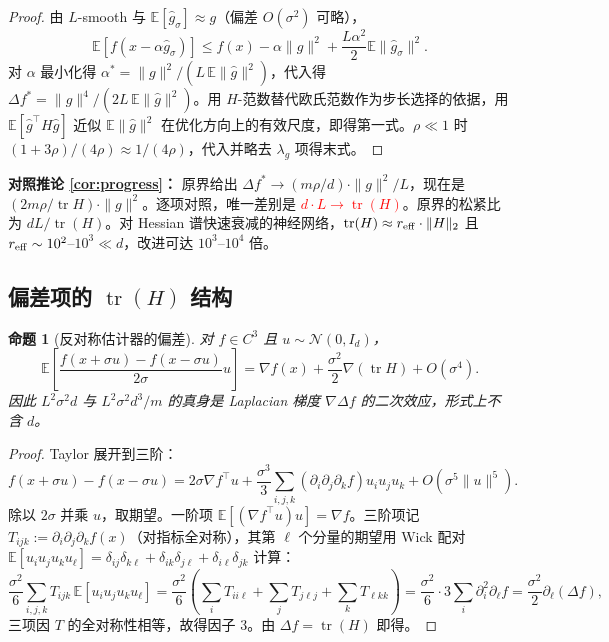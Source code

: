 \documentclass[UTF8]{ctexart}
\newtheorem{proposition}{命题}
\begin{document}
\begin{proof}
由 $L$-smooth 与 $\mathbb E[\widehat g_\sigma]\approx g$（偏差 $O(\sigma^2)$ 可略），
\[
\mathbb E[f(x - \alpha\widehat g_\sigma)]
\leq
f(x) - \alpha\|g\|^2 + \frac{L\alpha^2}{2}\mathbb E\|\widehat g_\sigma\|^2.
\]
对 $\alpha$ 最小化得 $\alpha^* = \|g\|^2/(L\,\mathbb E\|\widehat g\|^2)$，代入得 $\Delta f^* = \|g\|^4/(2L\,\mathbb E\|\widehat g\|^2)$。用 $H$-范数替代欧氏范数作为步长选择的依据，用 $\mathbb E[\widehat g^\top H\widehat g]$ 近似 $\mathbb E\|\widehat g\|^2$ 在优化方向上的有效尺度，即得第一式。$\rho\ll 1$ 时 $(1+3\rho)/(4\rho)\approx 1/(4\rho)$，代入并略去 $\lambda_g$ 项得末式。
\end{proof}

\textbf{对照推论 \ref{cor:progress}：} 原界给出 $\Delta f^* \to (m\rho/d)\cdot\|g\|^2/L$，现在是 $(2m\rho/\operatorname{tr} H)\cdot\|g\|^2$。逐项对照，唯一差别是 \textcolor{red}{$d\cdot L \to \operatorname{tr}(H)$}。原界的松紧比为 $dL/\operatorname{tr}(H)$。对 Hessian 谱快速衰减的神经网络，$\operatorname{tr}(H) \approx r_{\rm eff}\cdot\|H\|_2$ 且 $r_{\rm eff} \sim 10^2$–$10^3 \ll d$，改进可达 $10^3$–$10^4$ 倍。

\subsection{偏差项的 $\operatorname{tr}(H)$ 结构}

\begin{proposition}[反对称估计器的偏差]
\label{prop:bias-trace}
对 $f\in C^3$ 且 $u\sim\mathcal N(0,I_d)$，
\[
\boxed{
\mathbb E\left[\frac{f(x+\sigma u) - f(x-\sigma u)}{2\sigma}u\right]
=
\nabla f(x) + \frac{\sigma^2}{2}\nabla(\operatorname{tr} H) + O(\sigma^4).
}
\]
因此 $L^2\sigma^2 d$ 与 $L^2\sigma^2 d^3/m$ 的真身是 Laplacian 梯度 $\nabla\Delta f$ 的二次效应，形式上不含 $d$。
\end{proposition}

\begin{proof}
Taylor 展开到三阶：
\[
f(x+\sigma u) - f(x-\sigma u)
=
2\sigma\nabla f^\top u + \frac{\sigma^3}{3}\sum_{i,j,k}(\partial_i\partial_j\partial_k f)u_i u_j u_k + O(\sigma^5\|u\|^5).
\]
除以 $2\sigma$ 并乘 $u$，取期望。一阶项 $\mathbb E[(\nabla f^\top u)u] = \nabla f$。三阶项记 $T_{ijk} := \partial_i\partial_j\partial_k f(x)$（对指标全对称），其第 $\ell$ 个分量的期望用 Wick 配对 $\mathbb E[u_i u_j u_k u_\ell] = \delta_{ij}\delta_{k\ell} + \delta_{ik}\delta_{j\ell} + \delta_{i\ell}\delta_{jk}$ 计算：
\[
\frac{\sigma^2}{6}\sum_{i,j,k}T_{ijk}\,\mathbb E[u_i u_j u_k u_\ell]
=
\frac{\sigma^2}{6}\left(\sum_i T_{ii\ell} + \sum_j T_{j\ell j} + \sum_k T_{\ell kk}\right)
=
\frac{\sigma^2}{6}\cdot 3\sum_i \partial_i^2\partial_\ell f
=
\frac{\sigma^2}{2}\partial_\ell(\Delta f),
\]
三项因 $T$ 的全对称性相等，故得因子 $3$。由 $\Delta f = \operatorname{tr}(H)$ 即得。
\end{proof}
\end{document}

